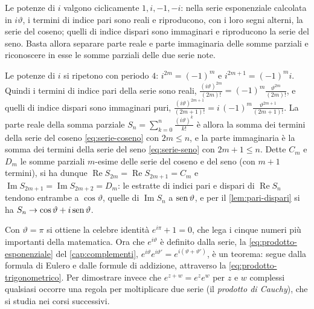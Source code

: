 \begin{strategia}
Le potenze di $i$ valgono ciclicamente $1,i,-1,-i$: nella serie esponenziale calcolata in
$i\vartheta$, i termini di indice pari sono reali e riproducono, con i loro segni alterni, la serie
del coseno; quelli di indice dispari sono immaginari e riproducono la serie del seno.
Basta allora separare parte reale e parte immaginaria delle somme parziali e
riconoscere in esse le somme parziali delle due serie note.
\end{strategia}

\begin{dimostrazione}
Le potenze di $i$ si ripetono con periodo $4$: $i^{2m}=(-1)^{m}$ e $i^{2m+1}=(-1)^{m}i$. Quindi i
termini di indice pari della serie sono reali, $\frac{(i\vartheta)^{2m}}{(2m)!}=(-1)^{m}\frac{\vartheta^{2m}}{(2m)!}$, e
quelli di indice dispari sono immaginari puri,
$\frac{(i\vartheta)^{2m+1}}{(2m+1)!}=i\,(-1)^{m}\frac{\vartheta^{2m+1}}{(2m+1)!}$. La parte reale della somma parziale
$S_{n}=\sum_{k=0}^{n}\frac{(i\vartheta)^{k}}{k!}$ è allora la somma dei termini della serie del coseno
\eqref{eq:serie-coseno} con $2m\le n$, e la parte immaginaria è la somma dei termini della
serie del seno \eqref{eq:serie-seno} con $2m+1\le n$. Dette $C_{m}$ e $D_{m}$ le somme parziali
$m$-esime delle serie del coseno e del seno (con $m+1$ termini), si ha dunque
$\operatorname{Re}S_{2m}=\operatorname{Re}S_{2m+1}=C_{m}$ e $\operatorname{Im}S_{2m+1}=\operatorname{Im}S_{2m+2}=D_{m}$:
le estratte di indici pari e dispari di $\operatorname{Re}S_{n}$ tendono entrambe a $\cos\vartheta$, quelle di
$\operatorname{Im}S_{n}$ a $\operatorname{sen}\vartheta$, e per il \cref{lem:pari-dispari} si ha
$S_{n}\to\cos\vartheta+i\operatorname{sen}\vartheta$.
\end{dimostrazione}

Con $\vartheta=\pi$ si ottiene la celebre identità $e^{i\pi}+1=0$, che lega i cinque numeri più
importanti della matematica. Ora che $e^{i\vartheta}$ è definito dalla serie, la
\eqref{eq:prodotto-esponenziale} del \cref{cap:complementi},
$e^{i\vartheta}e^{i\vartheta'}=e^{i(\vartheta+\vartheta')}$, è un teorema: segue dalla formula di Eulero e dalle
formule di addizione, attraverso la \eqref{eq:prodotto-trigonometrico}. Per dimostrare
invece che $e^{z+w}=e^{z}e^{w}$ per $z$ e $w$ complessi qualsiasi occorre una regola per
moltiplicare due serie (il \emph{prodotto di Cauchy}), che si studia nei corsi
successivi.


